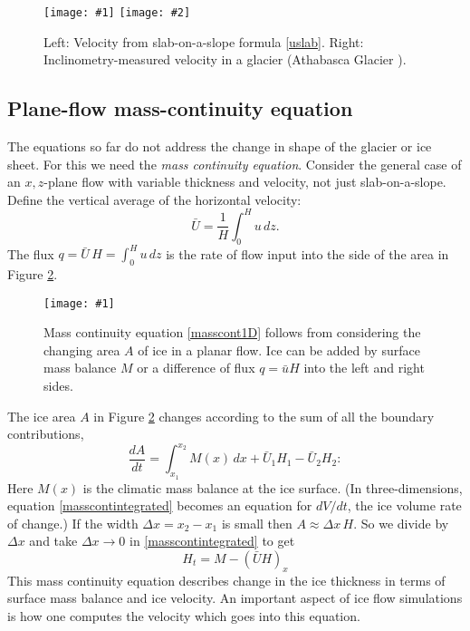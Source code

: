 \documentclass[letterpaper,final,12pt,reqno]{amsart}
\newcommand{\onefigsize}[3]{
\begin{figure}[ht]
\centering
\texttt{[image: \#1]}
\caption{#2}
\label{fig:#1}
\end{figure}}
\newcommand{\twofigsizes}[5]{
\begin{figure}[ht]
\centering
\texttt{[image: \#1]} \quad
\texttt{[image: \#2]}
\caption{#3}
\label{fig:#1}
\end{figure}}
\begin{document}
\twofigsizes{slabvel}{athabasca-deform}{Left:  Velocity from slab-on-a-slope formula \eqref{uslab}.  Right:  Inclinometry-measured velocity in a glacier (Athabasca Glacier \cite{SavagePaterson}).}{2.0in}{1.8in}

\subsection*{Plane-flow mass-continuity equation}  The equations so far do not address the change in shape of the glacier or ice sheet.  For this we need the \emph{mass continuity equation}.  Consider the general case of an $x,z$-plane flow with variable thickness and velocity, not just slab-on-a-slope.  Define the vertical average of the horizontal velocity:
	$$\bar U = \frac{1}{H}\int_0^{H} u\,dz.$$
The flux $q=\bar U\, H = \int_0^{H} u\,dz$ is the rate of flow input into the side of the area in Figure \ref{fig:slabmasscontfig}.

\onefigsize{slabmasscontfig}{Mass continuity equation \eqref{masscont1D} follows from considering the changing area $A$ of ice in a planar flow.  Ice can be added by surface mass balance $M$ or a difference of flux $q=\bar u H$ into the left and right sides.}{2.5in}

The ice area $A$ in Figure \ref{fig:slabmasscontfig} changes according to the sum of all the boundary contributions,
\begin{equation}
\frac{dA}{dt} = \int_{x_1}^{x_2} M(x)\,dx + \bar U_1 H_1 - \bar U_2 H_2: \label{masscontintegrated}
\end{equation}
Here $M(x)$ is the climatic mass balance at the ice surface.  (In three-dimensions, equation \eqref{masscontintegrated} becomes an equation for $dV/dt$, the ice volume rate of change.)  If the width $\Delta x=x_2-x_1$ is small then $A\approx \Delta x\, H$.  So we divide by $\Delta x$ and take $\Delta x \to 0$ in \eqref{masscontintegrated} to get
\begin{equation}
H_t = M - \left(\bar U H\right)_x \label{masscont1D}
\end{equation}
This mass continuity equation describes change in the ice thickness in terms of surface mass balance and ice velocity.  An important aspect of ice flow simulations is how one computes the velocity which goes into this equation.
\end{document}
